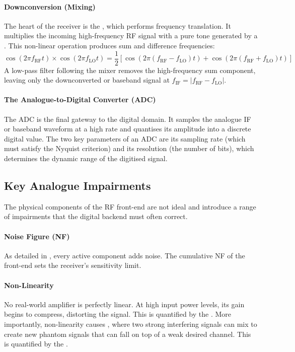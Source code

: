 \paragraph{Downconversion (Mixing)}
The heart of the receiver is the , which performs frequency translation. It multiplies the incoming high-frequency RF signal with a pure tone generated by a . This non-linear operation produces sum and difference frequencies:
\begin{equation}
    \cos(2\pi f_{\text{RF}}t) \times \cos(2\pi f_{\text{LO}}t) = \frac{1}{2}\left[ \cos(2\pi(f_{\text{RF}}-f_{\text{LO}})t) + \cos(2\pi(f_{\text{RF}}+f_{\text{LO}})t) \right]
\end{equation}
A low-pass filter following the mixer removes the high-frequency sum component, leaving only the downconverted  or baseband signal at \(f_{\text{IF}} = |f_{\text{RF}} - f_{\text{LO}}|\).

\paragraph{The Analogue-to-Digital Converter (ADC)}
The ADC is the final gateway to the digital domain. It samples the analogue IF or baseband waveform at a high rate and quantises its amplitude into a discrete digital value. The two key parameters of an ADC are its sampling rate (which must satisfy the Nyquist criterion) and its resolution (the number of bits), which determines the dynamic range of the digitised signal.

\subsection{Key Analogue Impairments}

The physical components of the RF front-end are not ideal and introduce a range of impairments that the digital backend must often correct.

\paragraph{Noise Figure (NF)}
As detailed in , every active component adds noise. The cumulative NF of the front-end sets the receiver's sensitivity limit.

\paragraph{Non-Linearity}
No real-world amplifier is perfectly linear. At high input power levels, its gain begins to compress, distorting the signal. This is quantified by the . More importantly, non-linearity causes , where two strong interfering signals can mix to create new phantom signals that can fall on top of a weak desired channel. This is quantified by the .

